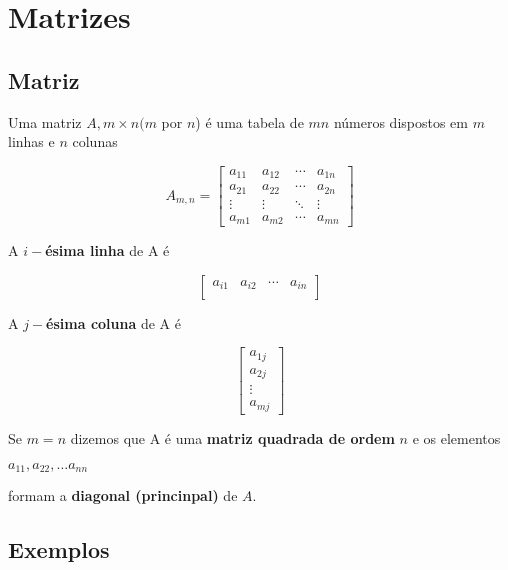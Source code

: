 \documentclass{article}
\begin{document}
\section{Matrizes}

\subsection{Matriz}

Uma matriz $A, m \times n( m$ por $n$) é uma tabela de $mn$ números dispostos em $m$ linhas e $n$ colunas

\begin{equation*}
    A_{m,n} = 
    \begin{bmatrix}
    a_{11} & a_{12} & \cdots & a_{1n} \\
    a_{21} & a_{22} & \cdots & a_{2n} \\
    \vdots  & \vdots  & \ddots & \vdots  \\
    a_{m1} & a_{m2} & \cdots & a_{mn} 
    \end{bmatrix}
\end{equation*}

A $i-$\textbf{ésima  linha }de A é 

\begin{equation*}
    \begin{bmatrix}
        a_{i1} & a_{i2} & \cdots & a_{in} \\
    \end{bmatrix}
\end{equation*}

A $j-$\textbf{ésima coluna} de A é 

\begin{equation*}
    \begin{bmatrix}
        a_{1j} \\
        a_{2j} \\
        \vdots \\
        a_{mj} 
    \end{bmatrix}
\end{equation*}

Se $m = n$ \bigbreak
dizemos que A é uma \textbf{matriz quadrada de ordem} $n$ e os elementos \newline
\begin{center}
    $ a_{11}, a_{22}, \hdots a_{nn}$
\end{center}
formam a \textbf{diagonal (princinpal)} de $A$.

\subsection{Exemplos}
\end{document}
